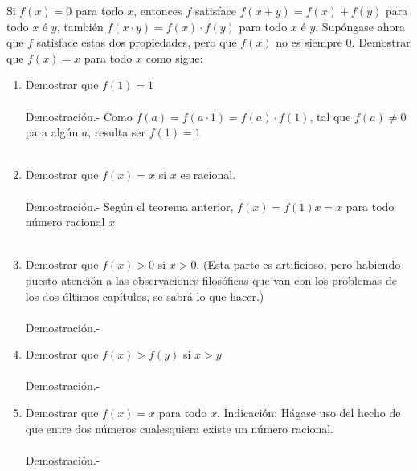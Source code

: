 \begin{teo}
Si $f(x)=0$ para todo $x$, entonces $f$ satisface $f(x+y) = f(x) +f(y)$ para todo $x$ é $y$, también $f(x \cdot y) = f(x) \cdot f(y)$ para todo $x$ é $y$. Supóngase ahora que $f$ satisface estas dos propiedades, pero que $f(x)$ no es siempre $0$. Demostrar que $f(x)=x$ para todo $x$ como sigue:
\begin{enumerate}[\bfseries a)]
\item Demostrar que $f(1) = 1$\\\\
Demostración.- \; Como $f(a)=f(a \cdot 1)=f(a) \cdot f(1)$, tal que $f(a) \neq 0$ para algún $a$, resulta ser $f(1)=1$\\\\

\item Demostrar que $f(x) = x$ si $x$ es racional. \\\\
Demostración.- \; Según el teorema anterior, $f(x) = f(1)x = x$ para todo número racional $x$\\\\

\item Demostrar que $f(x)> 0$ si $x>0.$ (Esta parte es artificioso, pero habiendo puesto atención a las observaciones filosóficas que van con los problemas de los dos últimos capítulos, se sabrá lo que hacer.)\\\\
Demostración.- \; 

\item Demostrar que $f(x)>f(y)$ si $x>y$\\\\
Demostración.- \; 

\item Demostrar que $f(x)=x$ para todo $x$. Indicación: Hágase uso del hecho de que entre dos números cualesquiera existe un número racional.\\\\
Demostración.- \; 
\end{enumerate}
\end{teo}


